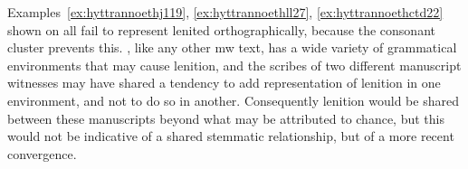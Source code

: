 Examples~\ref{ex:hyttrannoethj119}, \ref{ex:hyttrannoethll27}, \ref{ex:hyttrannoethctd22} shown on  all fail to represent lenited  orthographically, because the  consonant cluster prevents this. 
, like any other \gls{mw} text, has a wide variety of grammatical environments that may cause lenition, and the scribes of two different manuscript witnesses may have shared a tendency to add representation of lenition in one environment, and not to do so in another. Consequently lenition would be shared between these manuscripts beyond what may be attributed to chance, but this would not be indicative of a shared stemmatic relationship, but of a more recent convergence.

